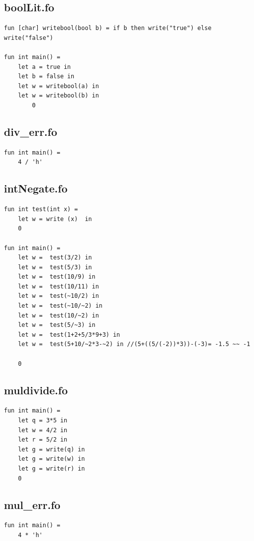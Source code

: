 \documentclass[11pt]{article}
\begin{document}
    \subsection{boolLit.fo}
    \begin{lstlisting}[basicstyle=\small]
fun [char] writebool(bool b) = if b then write("true") else write("false")

fun int main() =
    let a = true in
    let b = false in
    let w = writebool(a) in
    let w = writebool(b) in
        0
    \end{lstlisting}

    \subsection{div\_err.fo}
    \begin{lstlisting}[basicstyle=\small]
fun int main() =
    4 / 'h'
    \end{lstlisting}

    \subsection{intNegate.fo}
    \begin{lstlisting}[basicstyle=\small]
fun int test(int x) =
    let w = write (x)  in
    0

fun int main() =
    let w =  test(3/2) in
    let w =  test(5/3) in
    let w =  test(10/9) in
    let w =  test(10/11) in
    let w =  test(~10/2) in
    let w =  test(~10/~2) in
    let w =  test(10/~2) in
    let w =  test(5/~3) in
    let w =  test(1+2+5/3*9+3) in
    let w =  test(5+10/~2*3-~2) in //(5+((5/(-2))*3))-(-3)= -1.5 ~~ -1

    0
    \end{lstlisting}

    \subsection{muldivide.fo}
    \begin{lstlisting}[basicstyle=\small]
fun int main() =
    let q = 3*5 in
    let w = 4/2 in
    let r = 5/2 in
    let g = write(q) in
    let g = write(w) in
    let g = write(r) in
    0
    \end{lstlisting}

    \subsection{mul\_err.fo}
    \begin{lstlisting}[basicstyle=\small]
fun int main() =
    4 * 'h'
    \end{lstlisting}
\end{document}
